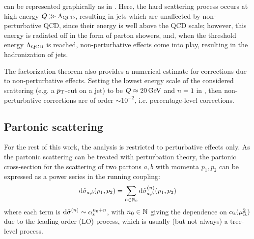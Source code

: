  can be represented graphically as in . Here, the hard scattering process occurs at high energy $ Q \gg \Lambda_\text{QCD} $, resulting in jets which are unaffected by non-perturbative QCD, since their energy is well above the QCD scale; however, this energy is radiated off in the form of parton showers, and, when the threshold energy $ \Lambda_\text{QCD} $ is reached, non-perturbative effects come into play, resulting in the hadronization of jets.

The factorization theorem also provides a numerical estimate for corrections due to non-perturbative effects. Setting the lowest energy scale of the considered scattering (e.g. a $ p_\text{T} $-cut on a jet) to be $ Q \approx 20\,\mathrm{GeV} $ and $ n = 1 $ in , then non-perturbative corrections are of order $ \sim 10^{-2} $, i.e. percentage-level corrections.

\subsection{Partonic scattering}

For the rest of this work, the analysis is restricted to perturbative effects only. As the partonic scattering can be treated with perturbation theory, the partonic cross-section for the scattering of two partons $ a , b $ with momenta $ p_1 , p_2 $ can be expressed as a power series in the running coupling:
\begin{equation}
  \mathrm{d}\hat{\sigma}_{a,b}(p_1 , p_2) = \sum_{n \in \mathbb{N}_0} \mathrm{d}\hat{\sigma}_{a,b}^{(n)}(p_1 , p_2)
  \label{eq:part-ser-exp}
\end{equation}
where each term is $ \mathrm{d}\hat{\sigma}^{(n)} \sim \alpha_\text{s}^{n_0 + n} $, with $ n_0 \in \mathbb{N} $ giving the dependence on $ \alpha_\text{s}(\mu_\text{R}^2) $ due to the leading-order (LO) process, which is usually (but not always) a tree-level process.

